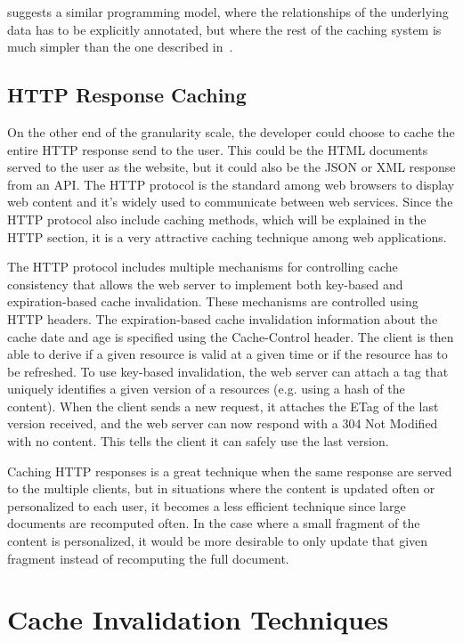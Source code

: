 \cite{paper:deploy-time} suggests a similar programming model, where the relationships of the underlying data has to be explicitly annotated, but where the rest of the caching system is much simpler than the one described in~\cite{paper:liskov}.

\subsection{HTTP Response Caching}

On the other end of the granularity scale, the developer could choose to cache the entire HTTP response send to the user. This could be the HTML documents served to the user as the website, but it could also be the JSON or XML response from an API. The HTTP protocol is the standard among web browsers to display web content and it’s widely used to communicate between web services. Since the HTTP protocol also include caching methods, which will be explained in the HTTP section, it is a very attractive caching technique among web applications.

The HTTP protocol includes multiple mechanisms for controlling cache consistency that allows the web server to implement both key-based and expiration-based cache invalidation. These mechanisms are controlled using HTTP headers. The expiration-based cache invalidation information about the cache date and age is specified using the Cache-Control header. The client is then able to derive if a given resource is valid at a given time or if the resource has to be refreshed. To use key-based invalidation, the web server can attach a tag that uniquely identifies a given version of a resources (e.g. using a hash of the content). When the client sends a new request, it attaches the ETag of the last version received, and the web server can now respond with a 304 Not Modified with no content. This tells the client it can safely use the last version.

Caching HTTP responses is a great technique when the same response are served to the multiple clients, but in situations where the content is updated often or personalized to each user, it becomes a less efficient technique since large documents are recomputed often. In the case where a small fragment of the content is personalized, it would be more desirable to only update that given fragment instead of recomputing the full document.

\section{Cache Invalidation Techniques}

